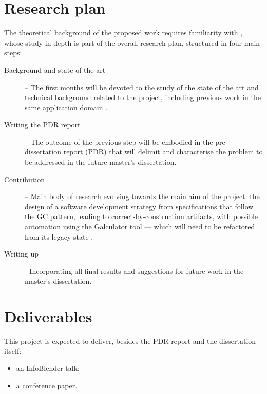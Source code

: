 \documentclass[a4paper, 11pt]{article} %
\begin{document}

\section*{Research plan}

The theoretical background of the proposed work requires familiarity with
\cite{BM97,Ba04a,Ol20}, whose study in depth is part of
the overall research plan, structured in four main steps:

\begin{description}

\item[Background and state of the art] -- The first months will be devoted
to the study of the state of the art and technical background related to
the project, including previous work in the same application domain \cite{SO08}.

\item[Writing the PDR report] -- The outcome of the previous step will be
embodied in the pre-dissertation report (PDR) that will delimit and characterise
the problem to be addressed in the future master’s dissertation.

\item[Contribution] -- Main body of research evolving towards the main aim of the
project: the design of a software development strategy from specifications 
that follow the GC pattern, leading to correct-by-construction
artifacts, with possible automation using the Galculator tool --- which will need to
be refactored from its legacy state \cite{SO08}.

\item[Writing up] - Incorporating all final results and suggestions for future
work in the master's dissertation.
\end{description}


\section*{Deliverables}

This project is expected to deliver, besides the PDR report and the dissertation itself:
\begin{itemize}
\item   an InfoBlender talk;
\item   a conference paper.
\end{itemize}
\end{document}
